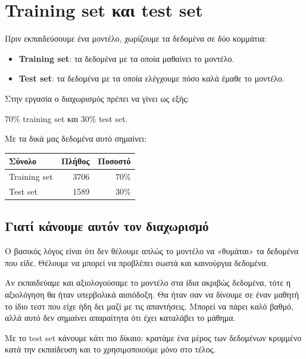 \documentclass[12pt,a4paper]{article}
\begin{document}
\section{Training set και test set}

Πριν εκπαιδεύσουμε ένα μοντέλο, χωρίζουμε τα δεδομένα σε δύο κομμάτια:

\begin{itemize}
    \item \textbf{Training set}: τα δεδομένα με τα οποία μαθαίνει το μοντέλο.
    \item \textbf{Test set}: τα δεδομένα με τα οποία ελέγχουμε πόσο καλά
    έμαθε το μοντέλο.
\end{itemize}

Στην εργασία ο διαχωρισμός πρέπει να γίνει ως εξής:

\begin{center}
70\% training set και 30\% test set.
\end{center}

Με τα δικά μας δεδομένα αυτό σημαίνει:

\begin{center}
\begin{tabular}{lrr}
\toprule
\textbf{Σύνολο} & \textbf{Πλήθος} & \textbf{Ποσοστό} \\
\midrule
Training set & 3706 & 70\% \\
Test set & 1589 & 30\% \\
\bottomrule
\end{tabular}
\end{center}

\subsection{Γιατί κάνουμε αυτόν τον διαχωρισμό}

Ο βασικός λόγος είναι ότι δεν θέλουμε απλώς το μοντέλο να «θυμάται» τα
δεδομένα που είδε. Θέλουμε να μπορεί να προβλέπει σωστά και καινούργια
δεδομένα.

Αν εκπαιδεύαμε και αξιολογούσαμε το μοντέλο στα ίδια ακριβώς δεδομένα, τότε η
αξιολόγηση θα ήταν υπερβολικά αισιόδοξη. Θα ήταν σαν να δίνουμε σε έναν
μαθητή το ίδιο τεστ που είχε ήδη δει μαζί με τις απαντήσεις. Μπορεί να πάρει
καλό βαθμό, αλλά αυτό δεν σημαίνει απαραίτητα ότι έχει καταλάβει το μάθημα.

Με το test set κάνουμε κάτι πιο δίκαιο: κρατάμε ένα μέρος των δεδομένων
κρυμμένο κατά την εκπαίδευση και το χρησιμοποιούμε μόνο στο τέλος.
\end{document}
